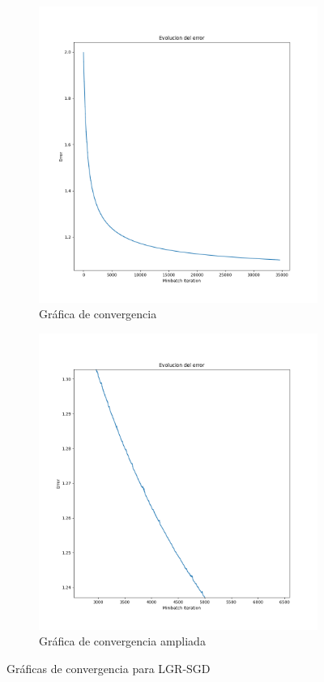 \documentclass[11pt]{article}
\begin{document}
\begin{figure}[H]
    \begin{subfigure}{0.4\textwidth}
        \includegraphics[scale=0.3]{grafica_convergencia_lgr}
        \caption{Gráfica de convergencia}
        \label{figure:sin_ampliar}
    \end{subfigure} \hspace{0.2\textwidth}
    \begin{subfigure}{0.4\textwidth}
        \includegraphics[scale=0.3]{grafica_convergencia_lgr_zoom}
        \caption{Gráfica de convergencia ampliada}
    \end{subfigure}
    \caption{Gráficas de convergencia para LGR-SGD}
\end{figure}
\end{document}
